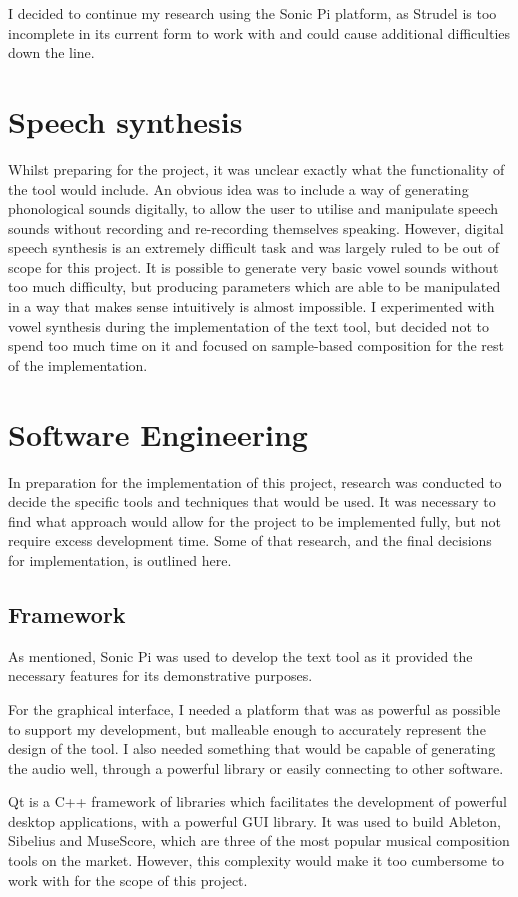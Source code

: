 \documentclass[12pt,a4paper,twoside,openright]{report}
\begin{document}
I decided to continue my research using the Sonic Pi platform, as Strudel is too incomplete in its current form to work with and could cause additional difficulties down the line.

\section{Speech synthesis}
Whilst preparing for the project, it was unclear exactly what the functionality of the tool would include. An obvious idea was to include a way of generating phonological sounds digitally, to allow the user to utilise and manipulate speech sounds without recording and re-recording themselves speaking. However, digital speech synthesis is an extremely difficult task and was largely ruled to be out of scope for this project. It is possible to generate very basic vowel sounds without too much difficulty, but producing parameters which are able to be manipulated in a way that makes sense intuitively is almost impossible. I experimented with vowel synthesis during the implementation of the text tool, but decided not to spend too much time on it and focused on sample-based composition for the rest of the implementation.

\section{Software Engineering}
In preparation for the implementation of this project, research was conducted to decide the specific tools and techniques that would be used. It was necessary to find what approach would allow for the project to be implemented fully, but not require excess development time. Some of that research, and the final decisions for implementation, is outlined here.

\subsection{Framework}
As mentioned, Sonic Pi was used to develop the text tool as it provided the necessary features for its demonstrative purposes.

For the graphical interface, I needed a platform that was as powerful as possible to support my development, but malleable enough to accurately represent the design of the tool. I also needed something that would be capable of generating the audio well, through a powerful library or easily connecting to other software.

Qt is a C++ framework of libraries which facilitates the development of powerful desktop applications, with a powerful GUI library. It was used to build Ableton, Sibelius and MuseScore, which are three of the most popular musical composition tools on the market. However, this complexity would make it too cumbersome to work with for the scope of this project.
\end{document}
